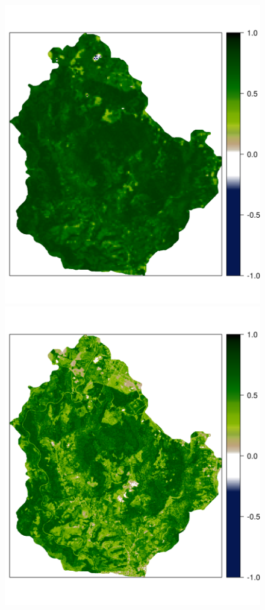 \begin{figure}[!ht]
\centering
\begin{minipage}[b]{0.45\textwidth}
\subcaption{}
\centering
\includegraphics[width = \textwidth]{fig/chap05-sat-old}
\end{minipage}
\begin{minipage}[b]{0.45\textwidth}
\subcaption{}
\centering
\includegraphics[width = \textwidth]{fig/chap05-sat-new}

\end{minipage}
\end{figure}
